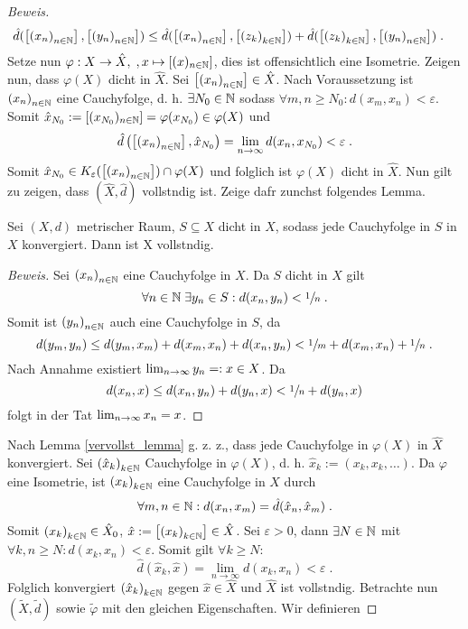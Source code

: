 \begin{proof}[Beweis]
\begin{align*}
		 \hat d(\left[ \left (x_n\right )_{n\in \mathbb{N}}\right],\left[ \left (y_n\right )_{n\in \mathbb{N}}\right]) &\leq \hat d(\left[ \left (x_n\right )_{n\in \mathbb{N}}\right], \left[ \left (z_k\right )_{k\in \mathbb{N}}\right]) + \hat d(\left[ \left (z_k\right )_{k\in \mathbb{N}}\right], \left[ \left (y_n\right )_{n\in \mathbb{N}}\right]) \;.
	\end{align*}
	Setze nun
	\(\varphi: X \to \hat X, \;, x \mapsto \left[ (x)_{n\in\mathbb{N}}\right]\), dies ist offensichtlich eine Isometrie. Zeigen nun, dass $\varphi(X)$ dicht in $\hat X$. Sei $\left[ \left (x_n\right )_{n\in \mathbb{N}}\right] \in \hat X$. Nach Voraussetzung ist $\left (x_n\right )_{n\in \mathbb{N}}$ eine Cauchyfolge, d. h. $\exists N_0 \in \mathbb{N}$ sodass \(\forall m,n \geq  N_0: d(x_m, x_n) < \varepsilon \). Somit \(\hat x_{N_0} := \left[ (x_{N_0})_{n \in \mathbb{N}}\right] = \varphi(x_{N_0}) \in \varphi(X)\) und
	\[\hat d\left (\left[ \left (x_n\right )_{n\in \mathbb{N}}\right], \hat x_{N_0} \right) = \lim_{n\to\infty} d(x_n, x_{N_0})< \varepsilon\; .\]
	Somit \(\hat x_{N_0} \in K_\varepsilon (\left[ \left (x_n\right )_{n\in \mathbb{N}}\right]) \cap \varphi(X)\) und folglich ist \(\varphi(X)\) dicht in $\hat X$.  Nun gilt zu zeigen, dass $(\hat X, \hat d)$ vollst\as ndig ist. Zeige daf\us r zun\as chst folgendes Lemma.
	\begin{lemma}
		Sei \((X,d)\) metrischer Raum, $S\subseteq X$ dicht in $X$, sodass jede Cauchyfolge in $S$ in $X$ konvergiert. Dann ist X vollst\as ndig.\label{vervollst_lemma}
	\end{lemma}
	\begin{proof}[Beweis]
		Sei $\left (x_n\right )_{n\in \mathbb{N}}$ eine Cauchyfolge in $X$. Da $S$ dicht in $X$ gilt
		\[\forall n \in \mathbb{N} \;\exists y_n \in S: d(x_n, y_n) < \sfrac 1n \;.\]
		Somit ist \(\left (y_n\right )_{n\in \mathbb{N}}\) auch eine Cauchyfolge in $S$, da
		\[d(y_m, y_n) \leq d(y_m, x_m) + d(x_m, x_n) + d(x_n, y_n) < \sfrac 1m + d(x_m, x_n) + \sfrac 1n \;.\]
		Nach Annahme existiert $\lim_{n \to \infty} y_n =: x \in X$. Da
		\[d(x_n, x) \leq d(x_n, y_n) + d(y_n, x) < \sfrac 1n + d(y_n, x)\]
		folgt in der Tat \(\lim_{n \to \infty} x_n = x\).
	\end{proof}
	Nach Lemma \ref{vervollst_lemma} g. z. z., dass jede Cauchyfolge in \(\varphi(X) \) in $\hat X$ konvergiert. Sei $\left (\hat x_k\right )_{k\in \mathbb{N}}$ Cauchyfolge in $\varphi(X)$, d. h. \(\hat x_k := (x_k, x_k,\ldots)\). Da $\varphi$ eine Isometrie, ist $\left (x_k\right )_{k\in \mathbb{N}}$ eine Cauchyfolge in $X$ durch 
	\[\forall m, n \in \mathbb{N}: d(x_n, x_m) = \hat d(\hat x_n, \hat x_m) \;.\]
	Somit \(\left (x_k\right )_{k\in \mathbb{N}} \in \hat X_0\), \(\hat x :=\left[ \left (x_k\right )_{k\in \mathbb{N}}\right] \in \hat X\). Sei $\varepsilon >0$, dann $\exists N \in \mathbb{N}$ mit \(\forall k, n \geq N: d(x_k, x_n) < \varepsilon\). Somit gilt \(\forall k \geq N\):
	\[\hat d(\hat x_k, \hat x) = \lim_{n\to\infty} d(x_k, x_n) < \varepsilon \;.\]
	Folglich konvergiert $\left (\hat x_k\right )_{k\in \mathbb{N}}$ gegen $\hat x \in \hat X$ und $\hat X$ ist vollst\as ndig.
	Betrachte nun \((\tilde X, \tilde d)\) sowie \(\tilde \varphi\) mit den gleichen Eigenschaften. Wir definieren 

\end{proof}
